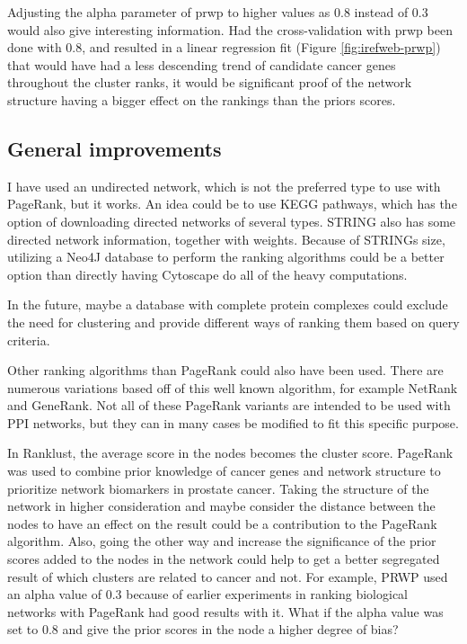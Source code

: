 Adjusting the alpha parameter of \gls{prwp} to higher values as 0.8 instead of 0.3 would also
give interesting information. Had the cross-validation with \gls{prwp} 
been done with 0.8, and resulted in a linear regression fit
(Figure \ref{fig:irefweb-prwp}) that would have had a less descending trend of
candidate cancer genes throughout the cluster ranks, it would be significant
proof of the network structure having a bigger effect on the rankings than the
priors scores.

\subsection{General improvements}
I have used an undirected network, which is not the preferred type to use with
PageRank, but it works. An idea could be to use KEGG pathways\cite{kegg}, which
has the option of downloading directed networks of several types.
STRING\cite{str} also has some directed network information, together with
weights. Because of STRINGs size, utilizing a Neo4J database to perform the
ranking algorithms could be a better option than directly having Cytoscape do
all of the heavy computations.

In the future, maybe a database with complete protein complexes could exclude
the need for clustering and provide different ways of ranking them based on
query criteria.

Other ranking algorithms than PageRank could also have been used. There are
numerous variations based off of this well known algorithm, for example NetRank
and GeneRank\cite{netrank,generank}. Not all of these PageRank variants are
intended to be used with PPI networks, but they can in many cases be modified to
fit this specific purpose.

In Ranklust, the average score in the nodes becomes the cluster score. PageRank
was used to combine prior knowledge of cancer genes and network structure to
prioritize network biomarkers in prostate cancer. Taking the structure of the
network in higher consideration and maybe consider the distance between the
nodes to have an effect on the result could be a contribution to the PageRank
algorithm. Also, going the other way and increase the significance of the prior
scores added to the nodes in the network could help to get a better segregated
result of which clusters are related to cancer and not. For example, PRWP used
an alpha value of 0.3 because of earlier experiments in ranking biological
networks with PageRank had good results with it. What if the alpha value was set
to 0.8 and give the prior scores in the node a higher degree of bias?

